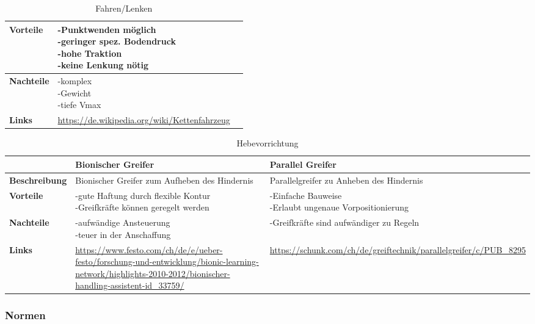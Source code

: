 \begin{table}[H]
\begin{tabularx}{\textwidth}{|l|X|X|}
  \hline
  \textbf{Vorteile}& \makecell{-Punktwenden möglich\\-geringer spez. Bodendruck\\-hohe Traktion\\-keine Lenkung nötig} & \\
  \hline
  \textbf{Nachteile} & \makecell{-komplex\\-Gewicht\\-tiefe Vmax} & \\
  \hline
  \textbf{Links} & \url{https://de.wikipedia.org/wiki/Kettenfahrzeug} & \\
  \hline
\end{tabularx}
\caption{Fahren/Lenken}
\label{table:drive/steer-components}
\end{table}




\begin{table}[H]
\centering
\small
\begin{tabularx}{\textwidth}{|l|X|X|}
\hline
\textbf{} & \textbf{Bionischer Greifer}&\textbf{Parallel Greifer}\\
  \hline
  \textbf{Beschreibung} & Bionischer Greifer zum Aufheben des Hindernis&   Parallelgreifer zu Anheben des Hindernis  \\
  \hline
  \textbf{Vorteile} & \makecell{-gute Haftung durch flexible Kontur \\-Greifkräfte können geregelt werden}&\makecell{-Einfache Bauweise\\ -Erlaubt ungenaue Vorpositionierung}  \\
  \hline
  \textbf{Nachteile}& \makecell{-aufwändige Ansteuerung \\ -teuer in der Anschaffung} &\makecell{-Greifkräfte sind aufwändiger zu Regeln \\ }     \\
  \hline
  \textbf{Links}  &   \url{https://www.festo.com/ch/de/e/ueber-festo/forschung-und-entwicklung/bionic-learning-network/highlights-2010-2012/bionischer-handling-assistent-id_33759/}       &  \url{https://schunk.com/ch/de/greiftechnik/parallelgreifer/c/PUB_8295} \\
  \hline
\end{tabularx}
\caption{Hebevorrichtung}
\label{table:lifting-components}
\end{table}


\subsubsection{Normen}

